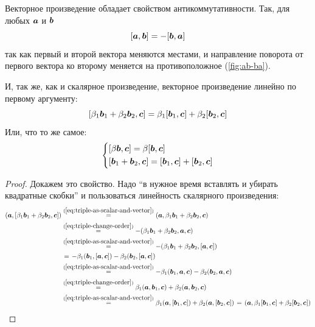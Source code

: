 \documentclass[a4paper,12pt]{article}
\begin{document}
  Векторное произведение обладает свойством антикоммутативности.
  Так, для любых $\boldsymbol a$ и $\boldsymbol b$
  \[
    [\boldsymbol a, \boldsymbol b] = -[\boldsymbol b, \boldsymbol a]
  \]
  так как первый и второй вектора меняются местами, и направление поворота от первого вектора ко второму меняется на противоположное (\ref{fig:ab-ba}).

  И, так же, как и скалярное произведение, векторное произведение линейно по первому аргументу:
  \[
    [\beta_1 \boldsymbol b_1 + \beta_2 \boldsymbol b_2, \boldsymbol c] = \beta_1 [\boldsymbol b_1, \boldsymbol c] + \beta_2 [\boldsymbol b_2, \boldsymbol c]
  \]
  Или, что то же самое:
  \[
    \left\{
      \begin{aligned}
        &[\beta \boldsymbol b, \boldsymbol c] = \beta [\boldsymbol b, \boldsymbol c]\\
        &[\boldsymbol b_1 + \boldsymbol b_2, \boldsymbol c] = [\boldsymbol b_1, \boldsymbol c] + [\boldsymbol b_2, \boldsymbol c]
      \end{aligned}
    \right.
  \]
  
  \begin{proof}
    Докажем это свойство.
    Надо ``в нужное время вставлять и убирать квадратные скобки'' и пользоваться линейность скалярного произведения:
    \begin{equation}
    \begin{split}
      (\boldsymbol a, [\beta_1 \boldsymbol b_1 + \beta_2 \boldsymbol b_2, \boldsymbol c])
      &\stackrel{(\ref{eq:triple-as-scalar-and-vector})}{=} (\boldsymbol a, \beta_1 \boldsymbol b_1 + \beta_2 \boldsymbol b_2, \boldsymbol c)\\
      &\stackrel{(\ref{eq:triple-change-order})}{=}         {-}(\beta_1 \boldsymbol b_1 + \beta_2 \boldsymbol b_2, \boldsymbol a, \boldsymbol c)\\
      &\stackrel{(\ref{eq:triple-as-scalar-and-vector})}{=} {-}(\beta_1 \boldsymbol b_1 + \beta_2 \boldsymbol b_2, [\boldsymbol a, \boldsymbol c])\\
      &\stackrel{\hphantom{(1)}}{=}                         {-}\beta_1(\boldsymbol b_1, [\boldsymbol a, \boldsymbol c]) - \beta_2(\boldsymbol b_2, [\boldsymbol a, \boldsymbol c])\\
      &\stackrel{(\ref{eq:triple-as-scalar-and-vector})}{=} {-}\beta_1(\boldsymbol b_1, \boldsymbol a, \boldsymbol c) - \beta_2(\boldsymbol b_2, \boldsymbol a, \boldsymbol c)\\
      &\stackrel{(\ref{eq:triple-change-order})}{=}         \beta_1(\boldsymbol a, \boldsymbol b_1, \boldsymbol c) + \beta_2(\boldsymbol a, \boldsymbol b_2, \boldsymbol c)\\
      &\stackrel{(\ref{eq:triple-as-scalar-and-vector})}{=} \beta_1(\boldsymbol a, [\boldsymbol b_1, \boldsymbol c]) + \beta_2(\boldsymbol a, [\boldsymbol b_2, \boldsymbol c])
      \stackrel{\hphantom{(1)}}{=}                         (\boldsymbol a, \beta_1[\boldsymbol b_1, \boldsymbol c] + \beta_2[\boldsymbol b_2, \boldsymbol c])
    \end{split}
    \end{equation}
  \end{proof}
  
\end{document}
